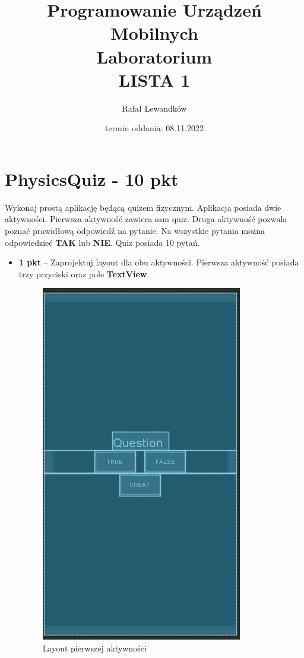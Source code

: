 \documentclass[a4paper]{article}
\title{Programowanie Urządzeń Mobilnych \\ Laboratorium \\ \textbf{LISTA 1}}
\author{Rafał Lewandków}
\date{termin oddania: 08.11.2022}
\begin{document}
\maketitle
    

\section*{PhysicsQuiz - 10 pkt}

Wykonaj prostą aplikację będącą quizem fizycznym. Aplikacja posiada dwie aktywności. Pierwsza aktywność zawiera sam quiz. Druga aktywność pozwala poznać prawidłową odpowiedź na pytanie. Na wszystkie pytania można odpowiedzieć \textbf{TAK} lub \textbf{NIE}. Quiz posiada 10 pytań.

\begin{itemize}
\item \textbf{1 pkt} -- Zaprojektuj layout dla obu aktywności. Pierwsza aktywność posiada trzy przyciski oraz pole \textbf{TextView}

\begin{figure}[h]
\centering
\caption{Layout pierwszej aktywności}
\includegraphics[scale=0.7]{l1.png}
\end{figure}


\end{itemize}
\end{document}
